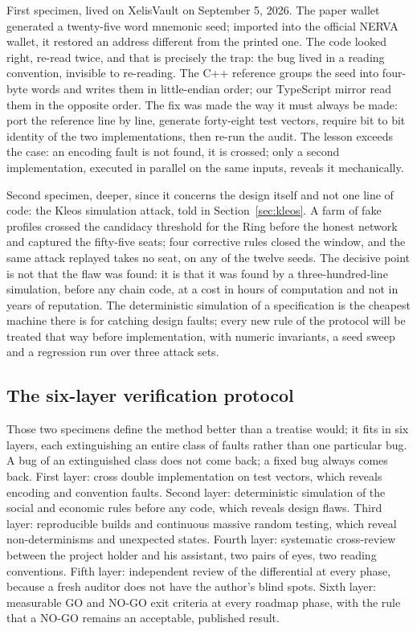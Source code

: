 First specimen, lived on XelisVault on September 5, 2026. The paper
wallet generated a twenty-five word mnemonic seed; imported into the
official NERVA wallet, it restored an address different from the printed
one. The code looked right, re-read twice, and that is precisely the
trap: the bug lived in a reading convention, invisible to re-reading.
The C++ reference groups the seed into four-byte words and writes them
in little-endian order; our TypeScript mirror read them in the opposite
order. The fix was made the way it must always be made: port the
reference line by line, generate forty-eight test vectors, require bit
to bit identity of the two implementations, then re-run the audit. The
lesson exceeds the case: an encoding fault is not found, it is crossed;
only a second implementation, executed in parallel on the same inputs,
reveals it mechanically.

Second specimen, deeper, since it concerns the design itself and not one
line of code: the Kleos simulation attack, told in
Section~\ref{sec:kleos}. A farm of fake profiles crossed the candidacy
threshold for the Ring before the honest network and captured the
fifty-five seats; four corrective rules closed the window, and the same
attack replayed takes no seat, on any of the twelve seeds. The decisive
point is not that the flaw
was found: it is that it was found by a three-hundred-line simulation,
before any chain code, at a cost in hours of computation and not in
years of reputation. The deterministic simulation of a specification is
the cheapest machine there is for catching design faults; every new rule
of the protocol will be treated that way before implementation, with
numeric invariants, a seed sweep and a regression run over three attack
sets.

\subsection{The six-layer verification protocol}

Those two specimens define the method better than a treatise would; it
fits in six layers, each extinguishing an entire class of faults rather
than one particular bug. A bug of an extinguished class does not come
back; a fixed bug always comes back. First layer: cross double
implementation on test vectors, which reveals encoding and convention
faults. Second layer: deterministic simulation of the social and
economic rules before any code, which reveals design flaws. Third layer:
reproducible builds and continuous massive random testing, which reveal
non-determinisms and unexpected states. Fourth layer: systematic
cross-review between the project holder and his assistant, two pairs of
eyes, two reading conventions. Fifth layer: independent review of the
differential at every phase, because a fresh auditor does not have the
author's blind spots. Sixth layer: measurable GO and NO-GO exit criteria
at every roadmap phase, with the rule that a NO-GO remains an acceptable,
published result.

